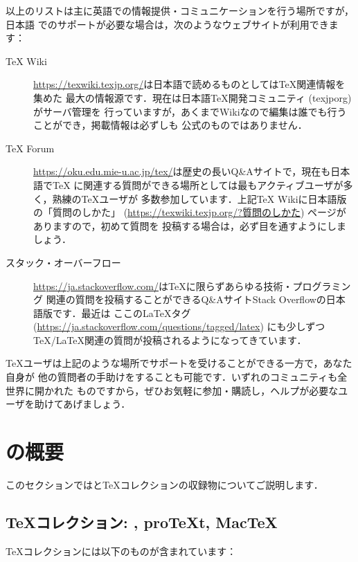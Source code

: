 \documentclass[uplatex,dvipdfmx]{jsarticle}
\begin{document}
%
以上のリストは主に英語での情報提供・コミュニケーションを行う場所ですが，日本語
でのサポートが必要な場合は，次のようなウェブサイトが利用できます：
%
\begin{description}
\item[{\TeX} Wiki]
\url{https://texwiki.texjp.org/}は日本語で読めるものとしては\TeX 関連情報を集めた
最大の情報源です．現在は日本語\TeX 開発コミュニティ (texjporg) がサーバ管理を
行っていますが，あくまでWikiなので編集は誰でも行うことができ，掲載情報は必ずしも
公式のものではありません．

\item[{\TeX} Forum]
\url{https://oku.edu.mie-u.ac.jp/tex/}は歴史の長いQ\&Aサイトで，現在も日本語で\TeX
に関連する質問ができる場所としては最もアクティブユーザが多く，熟練の\TeX ユーザが
多数参加しています．上記{\TeX} Wikiに日本語版の「質問のしかた」
(\url{https://texwiki.texjp.org/?質問のしかた}) ページがありますので，初めて質問を
投稿する場合は，必ず目を通すようにしましょう．

\item[スタック・オーバーフロー]
\url{https://ja.stackoverflow.com/}は\TeX に限らずあらゆる技術・プログラミング
関連の質問を投稿することができるQ\&AサイトStack Overflowの日本語版です．最近は
ここの\LaTeX タグ (\url{https://ja.stackoverflow.com/questions/tagged/latex})
にも少しずつ\TeX/\LaTeX 関連の質問が投稿されるようになってきています．
\end{description}

\TeX ユーザは上記のような場所でサポートを受けることができる一方で，あなた自身が
他の質問者の手助けをすることも可能です．いずれのコミュニティも全世界に開かれた
ものですから，ぜひお気軽に参加・購読し，ヘルプが必要なユーザを助けてあげましょう．

\section{\TL の概要}
\label{sec:overview-tl}

このセクションでは\TL と\TeX コレクションの収録物についてご説明します．

\subsection{\TeX コレクション: \TL, pro\TeX{}t, Mac\TeX}
\label{sec:tl-coll-dists}

\TeX コレクション\DVD には以下のものが含まれています：
\end{document}
